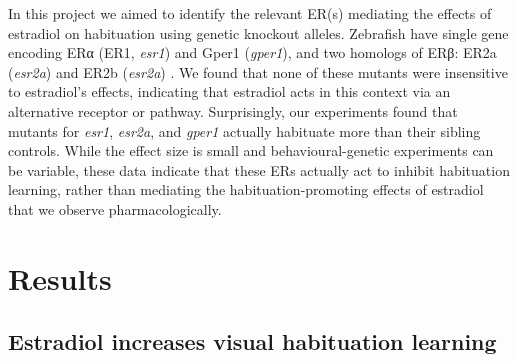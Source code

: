 \documentclass[10pt,lineno]{RandlettLab_elife}
\begin{document}
In this project we aimed to identify the relevant ER(s) mediating the effects of estradiol on habituation using genetic knockout alleles.
Zebrafish have single gene encoding ERα (ER1, \emph{esr1}) and Gper1 (\emph{gper1}), and two homologs of ERβ: ER2a (\emph{esr2a}) and ER2b (\emph{esr2a})  \citep{Romano2017-ep, Menuet2002-fo}.  
We found that none of these mutants were insensitive to estradiol's effects, indicating that estradiol acts in this context via an alternative receptor or pathway. 
Surprisingly, our experiments found that mutants for \emph{esr1}, \emph{esr2a}, and \emph{gper1} actually habituate more than their sibling controls. 
While the effect size is small and behavioural-genetic experiments can be variable, these data indicate that these ERs actually act to inhibit habituation learning, rather than mediating the habituation-promoting effects of estradiol that we observe pharmacologically. 

\newpage

\section{Results}

\subsection{Estradiol increases visual habituation learning}
\end{document}
